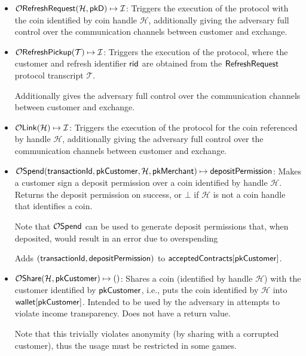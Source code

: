 \begin{itemize}
  \item $\mathcal{O}\mathsf{RefreshRequest}(\mathcal{H}, \mathsf{pkD}) \mapsto \mathcal{I}$:  Triggers the execution of the
     protocol with the coin identified by coin handle
    $\mathcal{H}$, additionally giving the adversary full control over the communication channels
    between customer and exchange.

  \item $\mathcal{O}\mathsf{RefreshPickup}(\mathcal{T}) \mapsto \mathcal{I}$:
    Triggers the execution of the  protocol, where the customer and refresh identifier $\mathsf{rid}$
    are obtained from the $\mathsf{RefreshRequest}$ protocol transcript $\mathcal{T}$.

    Additionally gives the adversary full control over the communication channels
    between customer and exchange.

  \item $\mathcal{O}\mathsf{Link}(\mathcal{H}) \mapsto \mathcal{I}$:  Triggers the execution of the
     protocol for the coin referenced by handle $\mathcal{H}$,
    additionally giving the adversary full control over the communication channels
    between customer and exchange.

  \item $\mathcal{O}\mathsf{Spend}(\mathsf{transactionId}, \mathsf{pkCustomer}, \mathcal{H}, \mathsf{pkMerchant}) \mapsto \mathsf{depositPermission}$:
    Makes a customer sign a deposit permission over a coin identified by handle
    $\mathcal{H}$.  Returns the deposit permission on success, or $\bot$ if $\mathcal{H}$
    is not a coin handle that identifies a coin.

    Note that $\mathcal{O}\mathsf{Spend}$ can be used to generate deposit permissions that,
    when deposited, would result in an error due to overspending

    Adds $(\mathsf{transactionId}, \mathsf{depositPermission})$ to $\mathsf{acceptedContracts}[\mathsf{pkCustomer}]$.

  \item $\mathcal{O}\mathsf{Share}(\mathcal{H}, \mathsf{pkCustomer}) \mapsto ()$:
    Shares a coin (identified by handle $\mathcal{H}$) with the customer
    identified by $\mathsf{pkCustomer}$, i.e., puts the coin identified by $\mathcal{H}$
    into $\mathsf{wallet}[\mathsf{pkCustomer}]$.  Intended to be used by the adversary in attempts to
    violate income transparency.  Does not have a return value.

    Note that this trivially violates anonymity (by sharing with a corrupted customer), thus the usage must
    be restricted in some games.


\end{itemize}
